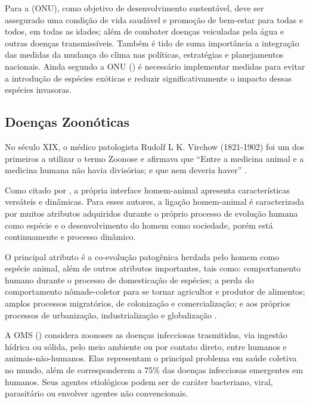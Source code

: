 \indent Para a  (\acrshort{ONU}), como objetivo de desenvolvimento sustentável, deve ser assegurado uma condição de vida saudável e promoção de bem-estar para todas e todos, em todas as idades; além de combater doenças veiculadas pela água e outras doenças transmissíveis. Também é tido de suma importância a integração das medidas da mudança do clima nas políticas, estratégias e planejamentos nacionais. Ainda segundo a \acrshort{ONU} (\citeyear{ONUODS22}) é necessário implementar medidas para evitar a introdução de espécies exóticas e reduzir significativamente o impacto dessas espécies invasoras.

\subsection{Doenças Zoonóticas}

\indent No século XIX, o médico patologista Rudolf L K. Virchow (1821-1902) foi um dos primeiros a utilizar o termo Zoonose e afirmava que “Entre a medicina animal e a medicina humana não havia divisórias; e que nem deveria haver” \cite{CFMVSaude}.

\indent Como citado por , a própria interface homem-animal apresenta características versáteis e dinâmicas. Para esses autores, a ligação homem-animal é caracterizada por muitos atributos adquiridos durante o próprio processo de evolução humana como espécie e o desenvolvimento do homem como sociedade, porém está continuamente e processo dinâmico.

\indent O principal atributo é a co-evolução patogênica herdada pelo homem como espécie animal, além de outros atributos importantes, tais como: comportamento humano durante o processo de domesticação de espécies; a perda do comportamento nômade-coletor para se tornar agricultor e produtor de alimentos; amplos processos migratórios, de colonização e comercialização;  e aos próprios processos de urbanização, industrialização e globalização \cite{HumanAnimalInterface}.

\indent A \acrshort{OMS} (\citeyear{WHO2020Zoonoses}) considera zoonoses as doenças infecciosas trasmitidas, via ingestão hídrica ou sólida, pelo meio ambiente ou por contato direto, entre humanos e animais-não-humanos. Elas representam o principal problema em saúde coletiva no mundo, além de corresponderem a 75\% das doenças infecciosas emergentes em humanos. Seus agentes etiológicos podem ser de caráter bacteriano, viral, parasitário ou envolver agentes não convencionais.

